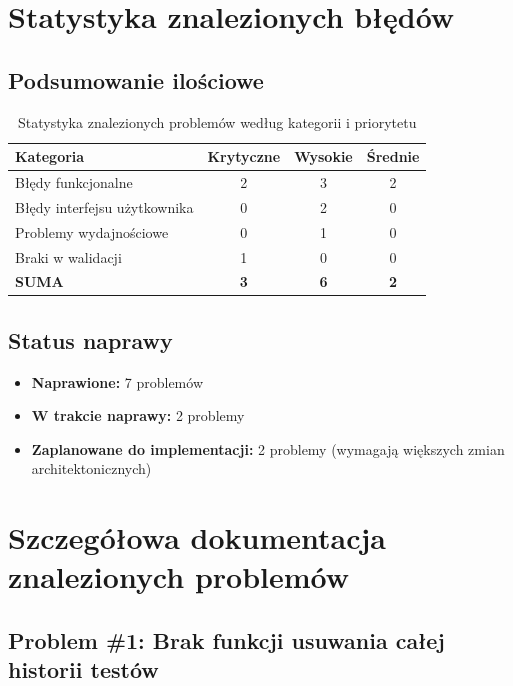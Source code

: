 \documentclass[12pt,a4paper]{article}
\begin{document}
\section{Statystyka znalezionych błędów}

\subsection{Podsumowanie ilościowe}

\begin{table}[H]
\centering
\begin{tabular}{|l|c|c|c|}
\hline
\textbf{Kategoria} & \textbf{Krytyczne} & \textbf{Wysokie} & \textbf{Średnie} \\
\hline
Błędy funkcjonalne & 2 & 3 & 2 \\
\hline
Błędy interfejsu użytkownika & 0 & 2 & 0 \\
\hline
Problemy wydajnościowe & 0 & 1 & 0 \\
\hline
Braki w walidacji & 1 & 0 & 0 \\
\hline
\textbf{SUMA} & \textbf{3} & \textbf{6} & \textbf{2} \\
\hline
\end{tabular}
\caption{Statystyka znalezionych problemów według kategorii i priorytetu}
\end{table}

\subsection{Status naprawy}

\begin{itemize}
    \item \textbf{Naprawione:} 7 problemów
    \item \textbf{W trakcie naprawy:} 2 problemy
    \item \textbf{Zaplanowane do implementacji:} 2 problemy (wymagają większych zmian architektonicznych)
\end{itemize}

\section{Szczegółowa dokumentacja znalezionych problemów}

\subsection{Problem \#1: Brak funkcji usuwania całej historii testów}
\end{document}
